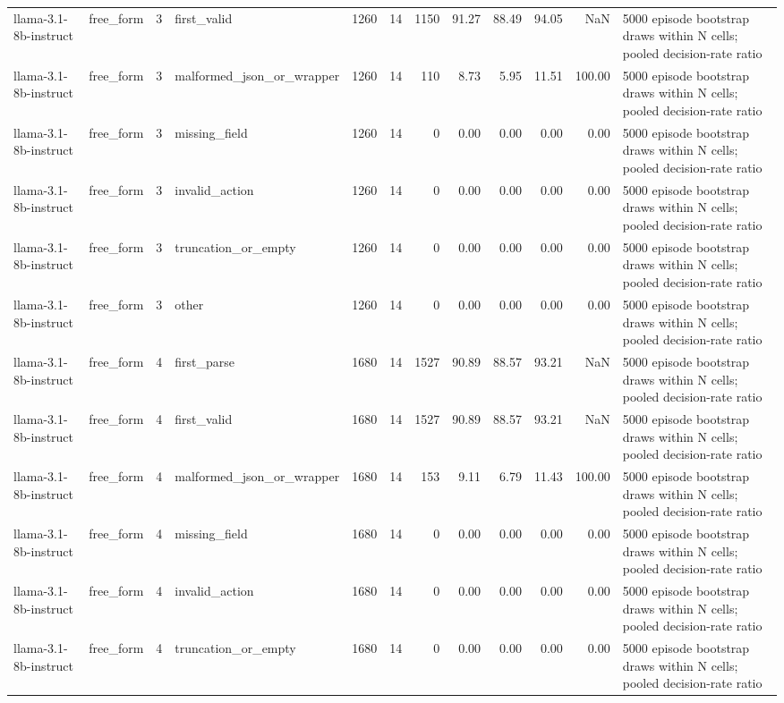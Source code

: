 \begin{tabular}{llllrrrrrrrl}
llama-3.1-8b-instruct & free\_form & 3 & first\_valid & 1260 & 14 & 1150 & 91.27 & 88.49 & 94.05 & NaN & 5000 episode bootstrap draws within N cells; pooled decision-rate ratio \\
llama-3.1-8b-instruct & free\_form & 3 & malformed\_json\_or\_wrapper & 1260 & 14 & 110 & 8.73 & 5.95 & 11.51 & 100.00 & 5000 episode bootstrap draws within N cells; pooled decision-rate ratio \\
llama-3.1-8b-instruct & free\_form & 3 & missing\_field & 1260 & 14 & 0 & 0.00 & 0.00 & 0.00 & 0.00 & 5000 episode bootstrap draws within N cells; pooled decision-rate ratio \\
llama-3.1-8b-instruct & free\_form & 3 & invalid\_action & 1260 & 14 & 0 & 0.00 & 0.00 & 0.00 & 0.00 & 5000 episode bootstrap draws within N cells; pooled decision-rate ratio \\
llama-3.1-8b-instruct & free\_form & 3 & truncation\_or\_empty & 1260 & 14 & 0 & 0.00 & 0.00 & 0.00 & 0.00 & 5000 episode bootstrap draws within N cells; pooled decision-rate ratio \\
llama-3.1-8b-instruct & free\_form & 3 & other & 1260 & 14 & 0 & 0.00 & 0.00 & 0.00 & 0.00 & 5000 episode bootstrap draws within N cells; pooled decision-rate ratio \\
llama-3.1-8b-instruct & free\_form & 4 & first\_parse & 1680 & 14 & 1527 & 90.89 & 88.57 & 93.21 & NaN & 5000 episode bootstrap draws within N cells; pooled decision-rate ratio \\
llama-3.1-8b-instruct & free\_form & 4 & first\_valid & 1680 & 14 & 1527 & 90.89 & 88.57 & 93.21 & NaN & 5000 episode bootstrap draws within N cells; pooled decision-rate ratio \\
llama-3.1-8b-instruct & free\_form & 4 & malformed\_json\_or\_wrapper & 1680 & 14 & 153 & 9.11 & 6.79 & 11.43 & 100.00 & 5000 episode bootstrap draws within N cells; pooled decision-rate ratio \\
llama-3.1-8b-instruct & free\_form & 4 & missing\_field & 1680 & 14 & 0 & 0.00 & 0.00 & 0.00 & 0.00 & 5000 episode bootstrap draws within N cells; pooled decision-rate ratio \\
llama-3.1-8b-instruct & free\_form & 4 & invalid\_action & 1680 & 14 & 0 & 0.00 & 0.00 & 0.00 & 0.00 & 5000 episode bootstrap draws within N cells; pooled decision-rate ratio \\
llama-3.1-8b-instruct & free\_form & 4 & truncation\_or\_empty & 1680 & 14 & 0 & 0.00 & 0.00 & 0.00 & 0.00 & 5000 episode bootstrap draws within N cells; pooled decision-rate ratio \\

\end{tabular}
